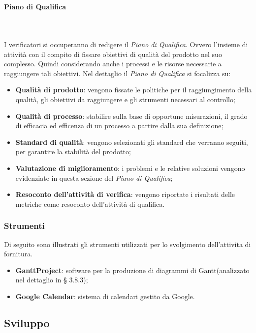 			\paragraph{Piano di Qualifica} \mbox{} \\ \mbox{} \\
			I verificatori si occuperanno di redigere il \textit{Piano di Qualifica}. Ovvero l'insieme di attività con il compito di fissare obiettivi di qualità del prodotto nel suo complesso. Quindi considerando anche i processi e le risorse necessarie a raggiungere tali obiettivi. Nel dettaglio il \textit{Piano di Qualifica} si focalizza su:
			\begin{itemize}
				\item \textbf{Qualità di prodotto}: vengono fissate le politiche per il raggiungimento della qualità, gli obiettivi da raggiungere e gli strumenti necessari al controllo;
				\item \textbf{Qualità di processo}: stabilire sulla base di opportune misurazioni, il grado di efficacia ed efficenza di un processo a partire dalla sua definizione;
				\item \textbf{Standard di qualità}: vengono selezionati gli standard che verranno seguiti, per garantire la stabilità del prodotto;
				\item \textbf{Valutazione di miglioramento}: i problemi e le relative soluzioni vengono evidenziate in questa sezione del \textit{Piano di Qualifica};
				\item \textbf{Resoconto dell'attività di verifica}: vengono riportate i risultati delle metriche come resoconto dell'attività di qualifica.
			\end{itemize}
		\subsubsection{Strumenti}
		Di seguito sono illustrati gli strumenti utilizzati per lo svolgimento dell'attivita di fornitura.
		\begin{itemize}
			\item \textbf{GanttProject}: software per la produzione di diagrammi di Gantt\glo (analizzato nel dettaglio in § 3.8.3);
			\item \textbf{Google Calendar}: sistema di calendari gestito da Google.
		\end{itemize}

	\subsection{Sviluppo}

